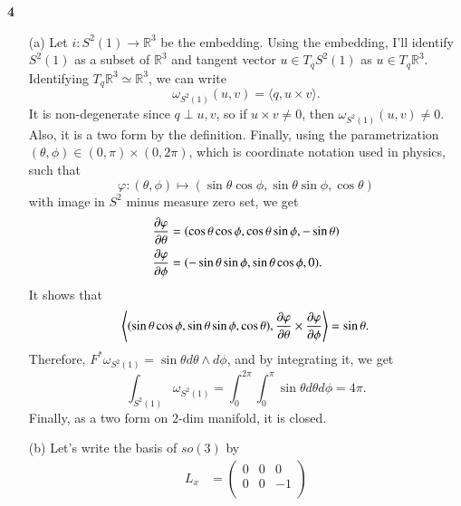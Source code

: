 \documentclass[a4paper, 12pt]{article}
\theoremstyle{Mydefinition}
\theoremstyle{Mytheorem}
\begin{document}
\noindent \textbf{4}
\begin{enumerate}
    \item[(a)] Let $i:S^2(1)\rightarrow \mathbb{R}^3$ be the embedding. Using the embedding, I'll identify $S^2(1)$ as a subset of $\mathbb{R}^3$ and tangent vector $u\in T_qS^2(1)$ as $u\in T_q\mathbb{R}^3$. Identifying $T_q\mathbb{R}^3\simeq \mathbb{R}^3$, we can write
    \begin{equation*}
        \omega_{S^2(1)}(u,v) = \langle q, u\times v\rangle.
    \end{equation*}
    It is non-degenerate since $q\perp u,v$, so if $u\times v\neq 0$, then $\omega_{S^2(1)}(u,v)\neq 0$. Also, it is a two form by the definition. Finally, using the parametrization $(\theta,\phi)\in(0,\pi)\times(0,2\pi)$, which is coordinate notation used in physics, such that 
    \begin{equation*}
        \varphi:(\theta,\phi)\mapsto (\sin\theta\cos\phi, \sin\theta\sin\phi, \cos\theta)
    \end{equation*}
    with image in $S^2$ minus measure zero set, we get
    \begin{equation*}
        \begin{split}
            \pdv{\varphi}{\theta} &= (\cos\theta\cos\phi, \cos\theta\sin\phi, -\sin\theta)\\
            \pdv{\varphi}{\phi} &= (-\sin\theta\sin\phi, \sin\theta\cos\phi, 0).
        \end{split}
    \end{equation*}
    It shows that
    \begin{equation*}
        \left\langle (\sin\theta\cos\phi, \sin\theta\sin\phi, \cos\theta), \pdv{\varphi}{\theta}\times \pdv{\varphi}{\phi} \right\rangle = \sin\theta.
    \end{equation*}
    Therefore, $F^*\omega_{S^2(1)} = \sin\theta d\theta\wedge d\phi$, and by integrating it, we get
    \begin{equation*}
        \int_{S^2(1)}\omega_{S^2(1)} = \int_0^{2\pi} \int_0^\pi \sin\theta d\theta d\phi = 4\pi.
    \end{equation*}
    Finally, as a two form on $2$-dim manifold, it is closed.
    \item[(b)] Let's write the basis of $\mathit{so}(3)$ by
\begin{equation*}
    \begin{split}
        L_x &= \begin{pmatrix}
        0 & 0 & 0\\
        0 & 0 & -1\\

\end{pmatrix}
\end{split}
\end{equation*}
\end{enumerate}
\end{document}
